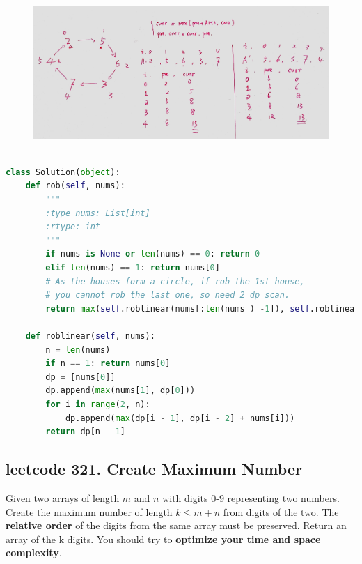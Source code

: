 \documentclass[a4paper,10pt]{article}
\begin{document}
\begin{figure}[h]
    \includegraphics[width=\textwidth]{leetcode213.jpg}
    \centering\\
\end{figure}

\begin{lstlisting}[language=Python, caption=Problem213. House Robber II]

class Solution(object):
    def rob(self, nums):
        """
        :type nums: List[int]
        :rtype: int
        """
        if nums is None or len(nums) == 0: return 0
        elif len(nums) == 1: return nums[0]
        # As the houses form a circle, if rob the 1st house, 
        # you cannot rob the last one, so need 2 dp scan.
        return max(self.roblinear(nums[:len(nums ) -1]), self.roblinear(nums[1:]))

    def roblinear(self, nums):
        n = len(nums)
        if n == 1: return nums[0]
        dp = [nums[0]]
        dp.append(max(nums[1], dp[0]))
        for i in range(2, n):
            dp.append(max(dp[i - 1], dp[i - 2] + nums[i]))
        return dp[n - 1]
\end{lstlisting}




\subsection{leetcode 321. Create Maximum Number}
Given two arrays of length $m$ and $n$ with digits 0-9 representing two numbers. Create the maximum number of length $k \leq m + n$ from digits of the two. The \textbf{relative order} of the digits from the same array must be preserved. Return an array of the k digits. You should try to \textbf{optimize your time and space complexity}.
\end{document}
